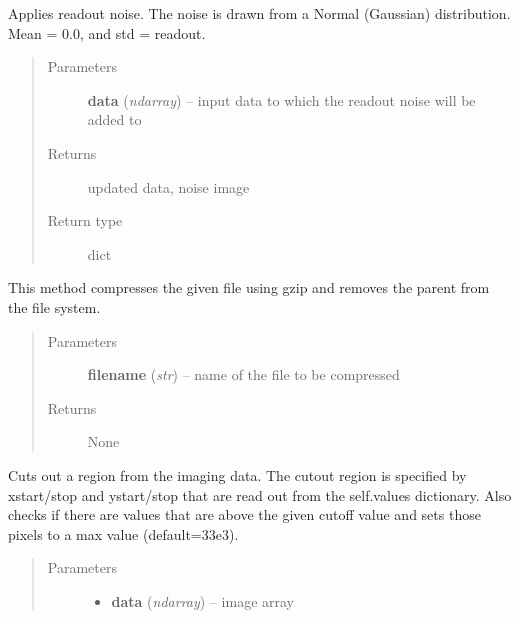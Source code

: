 \documentclass[a4paper,12pt,english]{sphinxmanual}
\begin{document}
\begin{fulllineitems}
\begin{fulllineitems}
\label{postproc:postproc.postprocessing.PostProcessing.applyReadoutNoise}
Applies readout noise. The noise is drawn from a Normal (Gaussian) distribution.
Mean = 0.0, and std = readout.
\begin{quote}\begin{description}
\item[{Parameters}] \leavevmode
\textbf{data} (\emph{ndarray}) -- input data to which the readout noise will be added to

\item[{Returns}] \leavevmode
updated data, noise image

\item[{Return type}] \leavevmode
dict

\end{description}\end{quote}

\end{fulllineitems}


\begin{fulllineitems}
\label{postproc:postproc.postprocessing.PostProcessing.compressAndRemoveFile}
This method compresses the given file using gzip and removes the parent from
the file system.
\begin{quote}\begin{description}
\item[{Parameters}] \leavevmode
\textbf{filename} (\emph{str}) -- name of the file to be compressed

\item[{Returns}] \leavevmode
None

\end{description}\end{quote}

\end{fulllineitems}


\begin{fulllineitems}
\label{postproc:postproc.postprocessing.PostProcessing.cutoutRegion}
Cuts out a region from the imaging data. The cutout region is specified by
xstart/stop and ystart/stop that are read out from the self.values dictionary.
Also checks if there are values that are above the given cutoff value and sets
those pixels to a max value (default=33e3).
\begin{quote}\begin{description}
\item[{Parameters}] \leavevmode\begin{itemize}
\item {} 
\textbf{data} (\emph{ndarray}) -- image array


\end{itemize}
\end{description}
\end{quote}
\end{fulllineitems}
\end{fulllineitems}
\end{document}
